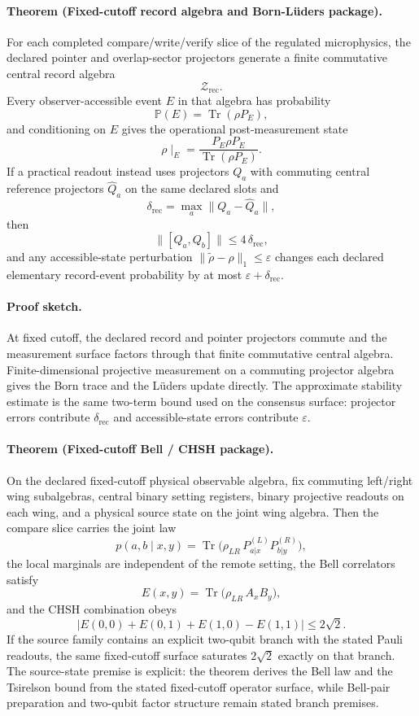 \paragraph{Theorem (Fixed-cutoff record algebra and Born-L\"uders package).}
For each completed compare/write/verify slice of the regulated microphysics, the declared pointer
and overlap-sector projectors generate a finite commutative central record algebra
\[
\mathcal Z_{\mathrm{rec}}.
\]
Every observer-accessible event \(E\) in that algebra has probability
\[
\mathbb P(E)=\operatorname{Tr}(\rho P_E),
\]
and conditioning on \(E\) gives the operational post-measurement state
\[
\rho\!\mid_E = \frac{P_E \rho P_E}{\operatorname{Tr}(\rho P_E)}.
\]
If a practical readout instead uses projectors \(Q_a\) with commuting central reference
projectors \(\widehat Q_a\) on the same declared slots and
\[
\delta_{\mathrm{rec}}=\max_a \|Q_a-\widehat Q_a\|,
\]
then
\[
\|[Q_a,Q_b]\|\le 4\,\delta_{\mathrm{rec}},
\]
and any accessible-state perturbation \(\|\widetilde\rho-\rho\|_1\le\varepsilon\) changes each
declared elementary record-event probability by at most \(\varepsilon+\delta_{\mathrm{rec}}\).

\paragraph{Proof sketch.}
At fixed cutoff, the declared record and pointer projectors commute and the measurement surface
factors through that finite commutative central algebra. Finite-dimensional projective
measurement on a commuting projector algebra gives the Born trace and the L\"uders update
directly. The approximate
stability estimate is the same two-term bound used on the consensus surface: projector errors
contribute \(\delta_{\mathrm{rec}}\) and accessible-state errors contribute \(\varepsilon\).

\paragraph{Theorem (Fixed-cutoff Bell / CHSH package).}
On the declared fixed-cutoff physical observable algebra, fix commuting left/right wing
subalgebras, central binary setting registers, binary projective readouts on each wing, and a
physical source state on the joint wing algebra. Then the compare slice carries the joint law
\[
p(a,b\mid x,y)
=
\operatorname{Tr}\!\bigl(\rho_{LR}\,P_{a|x}^{(L)}P_{b|y}^{(R)}\bigr),
\]
the local marginals are independent of the remote setting, the Bell correlators satisfy
\[
E(x,y)=\operatorname{Tr}\!\bigl(\rho_{LR}\,A_xB_y\bigr),
\]
and the CHSH combination obeys
\[
\bigl|E(0,0)+E(0,1)+E(1,0)-E(1,1)\bigr|
\le
2\sqrt2.
\]
If the source family contains an explicit two-qubit branch with the stated Pauli readouts, the
same fixed-cutoff surface saturates \(2\sqrt2\) exactly on that branch. The source-state premise
is explicit: the theorem derives the Bell law and the Tsirelson bound from the stated
fixed-cutoff operator surface, while Bell-pair preparation and two-qubit factor structure remain
stated branch premises.

